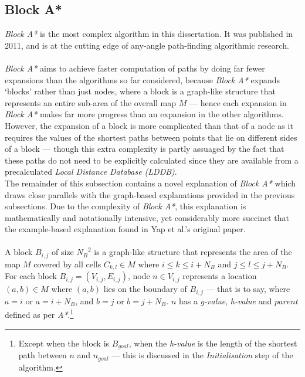 \documentclass[12pt,notitlepage]{report}
\begin{document}
\subsection {Block A*}

\noindent
{\em Block A*} is the most complex algorithm in this dissertation. It was published in 2011, and is at the cutting edge of any-angle path-finding algorithmic research.\\

\\
\noindent
{\em Block A*} aims to achieve faster computation of paths by doing far fewer expansions than the algorithms so far considered, because {\em Block A*} expands `blocks' rather than just nodes, where a block is a graph-like structure that represents an entire sub-area of the overall map $M$ --- hence each expansion in {\em Block A*} makes far more progress than an expansion in the other algorithms. However, the expansion of a block is more complicated than that of a node as it requires the values of the shortest paths between points that lie on different sides of a block --- though this extra complexity is partly assuaged by the fact that these paths do not need to be explicitly calculated since they are available from a precalculated {\em Local Distance Database (LDDB)}.\\

\noindent
The remainder of this subsection contains a novel explanation of {\em Block A*} which draws close parallels with the graph-based explanations provided in the previous subsections. Due to the complexity of {\em Block A*}, this explanation is mathematically and notationally intensive, yet considerably more succinct that the example-based explanation found in Yap et al.'s original paper\cite{Yap11}.\\

\\
\noindent
A block $B_{i,j}$ of size ${N_{B}}^{2}$ is a graph-like structure that represents the area of the map $M$ covered by all cells $C_{k,l} \in M$ where $i \leq k \leq i+N_{B}$ and $j \leq l \leq j+N_{B}$.\\

\noindent
For each block $B_{i,j} = (V_{i,j},E_{i,j})$, node $n \in V_{i,j}$ represents a location $(a,b) \in M$ where $(a,b)$ lies on the boundary of $B_{i,j}$ --- that is to say, where $a=i$ or $a=i+N_{B}$, and $b=j$ or $b=j+N_{B}$. $n$ has a {\em g-value}, {\em h-value} and $parent$ defined as per {\em A*}.\footnote{Except when the block is $B_{goal}$, when the {\em h-value} is the length of the shortest path between $n$ and $n_{goal}$ --- this is discussed in the {\em Initialisation} step of the algorithm.}\\
\end{document}
